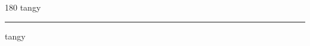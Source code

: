 
\begin{frame}
\begin{center}
\begin{turn}{180}
{\fontsize{2.5cm}{1em}\selectfont tangy}
\end{turn}
\vspace{1em}\par  
\hrule
\vspace{1em}\par  
{\fontsize{2.5cm}{1em}\selectfont tangy}
\end{center}
\end{frame}
